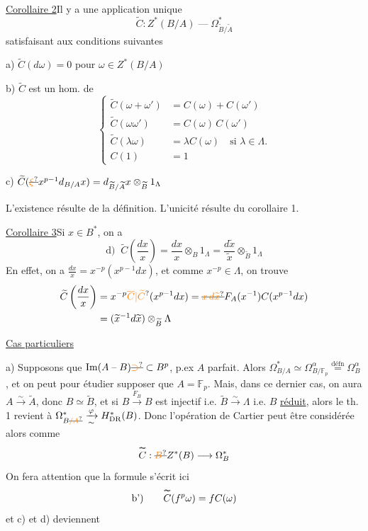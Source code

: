 \uline{Corollaire 2}\quad Il y a une application unique
\[
 \widetilde C:Z^*(B/A)\mathrel{\text{---}}\Omega^*_{\widetilde B/\widetilde A}
\]
satisfaisant aux conditions suivantes

a) $\widetilde C(d\omega)=0$ pour  $\omega\in Z^*(B/A)$

b) $\widetilde C$ est un hom. de 
\[
 \left\{\begin{aligned}
 \widetilde C(\omega+\omega')&=C(\omega)+C(\omega')\\
 \widetilde C(\omega\omega')&=C(\omega)\,C(\omega')\\
 \widetilde C(\lambda\omega)&=\lambda C(\omega)\quad\text{si }\lambda\in\Lambda.\\
 C(1)&=1
 \end{aligned}\right.
\]

c) $\widetilde C(\deleted{\unsure{\xi}}x^{p-1}d_{B/A}x)=d_{\widetilde B/\widetilde A}x\otimes_{\widetilde B}1_\Lambda$

L'existence résulte de la définition. L'unicité résulte du corollaire 1.

\uline{Corollaire 3}\quad Si $x\in B^*$, on a
\[
 \text{d) }\ \widetilde C\left(\frac{dx}{x}\right)=\frac{dx}{x}\otimes_B1_\Lambda
 =\frac{d\widetilde x}{\widetilde x}\otimes_{\widetilde B}1_\Lambda
\]
En effet, on a $\frac{dx}{x}=x^{-p}(x^{p-1}dx)$, et comme $x^{-p}\in\Lambda$, on trouve
\[
 \begin{aligned}
 \widetilde C\left(\frac{dx}{x}\right)
 &=x^{-p}\unsure{\overline C|\widetilde C}(x^{p-1}dx)=\deleted{\unsure{x\,d\widetilde x}}F_A(x^{-1})C(x^{p-1}dx)\\
 &=(\widetilde x^{-1}d\widetilde x)\otimes_{\widetilde B}\Lambda
 \end{aligned}
\]

\uline{Cas particuliers}

a) Supposons que $\operatorname{Im}(A\mathrel{\text{--}} B)\deleted{\unsure{\supset}}\subset B^p$,  p.ex $A$ parfait. Alors $\Omega^*_{B/A}\simeq\Omega^\alpha_{B/\mathbb F_p}\overset{\text{défn}}{=}\Omega^\alpha_B$, et on peut pour étudier  supposer que $A=\mathbb F_p$. Mais, dans ce dernier cas, on aura $A\xrightarrow{\sim}\widetilde A$, donc $B\simeq\widetilde B$, et si $B\xrightarrow{F_B}B$ est injectif i.e. $\widetilde B\xrightarrow{\sim}\Lambda$ i.e. $B$ \uline{réduit}, alors le th. 1 revient à $\Omega^*_{B\deleted{\unsure{/A}}}\xrightarrow[\sim]{\varphi}H^*_{\mathrm{DR}}(B)$. Donc l'opération de Cartier peut être considérée alors comme
\[
 \overset{\deleted{\sim}}{C}:\deleted{\unsure{B}}Z^*(B)\longrightarrow\Omega^*_B
\]
On fera attention que la  formule s'écrit ici
\[
 \text{b')}\qquad \overset{\deleted{\sim}}{C}(f^p\omega)=fC(\omega)
\]
et c) et d) deviennent

